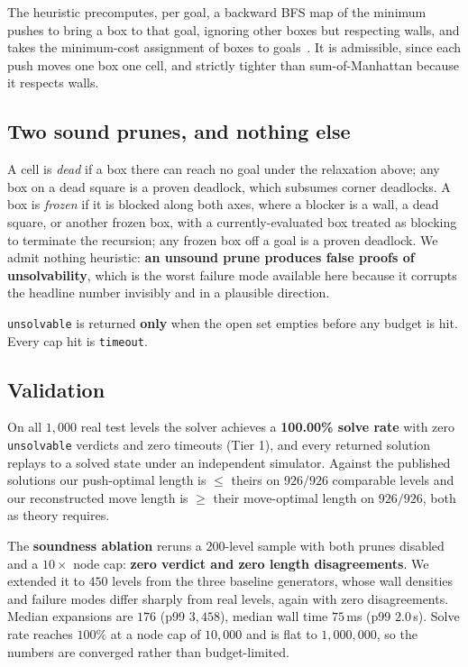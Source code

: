 \documentclass[conference]{IEEEtran}
\begin{document}
The heuristic precomputes, per goal, a backward BFS map of the minimum pushes to
bring a box to that goal, ignoring other boxes but respecting walls, and takes
the minimum-cost assignment of boxes to goals~\cite{kuhn1955hungarian}. It is
admissible, since each push moves one box one cell, and strictly tighter than
sum-of-Manhattan because it respects walls.

\subsection{Two sound prunes, and nothing else}
A cell is \emph{dead} if a box there can reach no goal under the relaxation
above; any box on a dead square is a proven deadlock, which subsumes corner
deadlocks. A box is \emph{frozen} if it is blocked along both axes, where a
blocker is a wall, a dead square, or another frozen box, with a
currently-evaluated box treated as blocking to terminate the recursion; any
frozen box off a goal is a proven deadlock. We admit nothing heuristic:
\textbf{an unsound prune produces false proofs of unsolvability}, which is the
worst failure mode available here because it corrupts the headline number
invisibly and in a plausible direction.

\texttt{unsolvable} is returned \textbf{only} when the open set empties before
any budget is hit. Every cap hit is \texttt{timeout}.

\subsection{Validation}
On all $1{,}000$ real test levels the solver achieves a \textbf{100.00\% solve
rate} with zero \texttt{unsolvable} verdicts and zero timeouts (Tier 1), and
every returned solution replays to a solved state under an independent
simulator. Against the published solutions our push-optimal length is $\leq$
theirs on $926/926$ comparable levels and our reconstructed move length is
$\geq$ their move-optimal length on $926/926$, both as theory requires.

The \textbf{soundness ablation} reruns a $200$-level sample with both prunes
disabled and a $10\times$ node cap: \textbf{zero verdict and zero length
disagreements}. We extended it to $450$ levels from the three baseline
generators, whose wall densities and failure modes differ sharply from real
levels, again with zero disagreements. Median expansions are $176$ (p99
$3{,}458$), median wall time $75$\,ms (p99 $2.0$\,s). Solve rate reaches $100\%$
at a node cap of $10{,}000$ and is flat to $1{,}000{,}000$, so the numbers are
converged rather than budget-limited.
\end{document}
